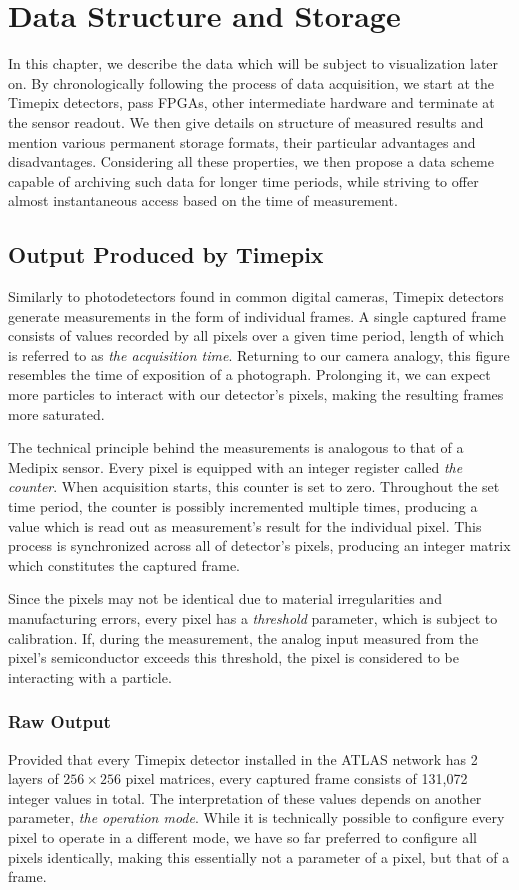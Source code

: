 \chapter{Data Structure and Storage}
In this chapter, we describe the data which will be subject to visualization later on. By chronologically following the process of data acquisition, we start at the Timepix detectors, pass FPGAs, other intermediate hardware and terminate at the sensor readout. We then give details on structure of measured results and mention various permanent storage formats, their particular advantages and disadvantages. Considering all these properties, we then propose a data scheme capable of archiving such data for longer time periods, while striving to offer almost instantaneous access based on the time of measurement.


\section{Output Produced by Timepix}
Similarly to photodetectors found in common digital cameras, Timepix detectors generate measurements in the form of individual frames. A single captured frame consists of values recorded by all pixels over a given time period, length of which is referred to as \textit{the acquisition time}. Returning to our camera analogy, this figure resembles the time of exposition of a photograph. Prolonging it, we can expect more particles to interact with our detector's pixels, making the resulting frames more saturated.

The technical principle behind the measurements is analogous to that of a Medipix sensor. Every pixel is equipped with an integer register called \textit{the counter}. When acquisition starts, this counter is set to zero. Throughout the set time period, the counter is possibly incremented multiple times, producing a value which is read out as measurement's result for the individual pixel. This process is synchronized across all of detector's pixels, producing an integer matrix which constitutes the captured frame.

Since the pixels may not be identical due to material irregularities and manufacturing errors, every pixel has a \textit{threshold} parameter, which is subject to calibration. If, during the measurement, the analog input measured from the pixel's semiconductor exceeds this threshold, the pixel is considered to be interacting with a particle.


\subsection{Raw Output}
Provided that every Timepix detector installed in the ATLAS network has 2 layers of $256 \times 256$ pixel matrices, every captured frame consists of 131,072 integer values in total. The interpretation of these values depends on another parameter, \textit{the operation mode}. While it is technically possible to configure every pixel to operate in a different mode, we have so far preferred to configure all pixels identically, making this essentially not a parameter of a pixel, but that of a frame.

